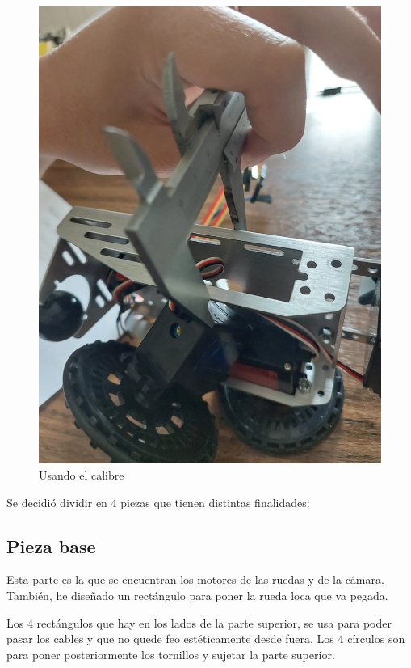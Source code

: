 \begin{figure}[ht!]
\begin{minipage}{0.4\linewidth}
		\includegraphics[width=\linewidth]{figs/cap5/calib2.jpeg}
		\caption*{\centering}
	\end{minipage}
	\caption{Usando el calibre}
	\label{fig:calibre}
\end{figure}


Se decidió dividir en 4 piezas que tienen distintas finalidades:

\subsection{Pieza base}
Esta parte es la que se encuentran los motores de las ruedas y de la cámara. También, he diseñado un rectángulo para poner la rueda loca que va pegada.

Los 4 rectángulos que hay en los lados de la parte superior, se usa para poder pasar los cables y que no quede feo estéticamente desde fuera. Los 4 círculos son para poner posteriormente los tornillos y sujetar la parte superior.

